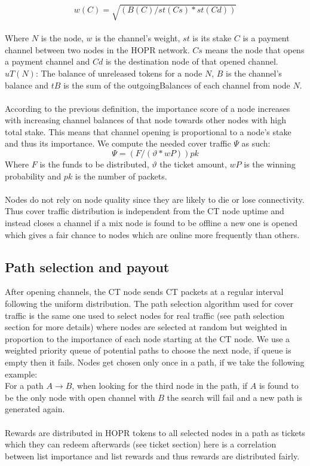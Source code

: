 $$w(C) = \sqrt{(B(C) / st(Cs) * st(Cd))}$$
\\
Where $N$ is the node, $w$ is the channel's weight, $st$ is its stake $C$ is a payment channel between two nodes in the HOPR network. $Cs$ means the node that opens a payment channel and 
$Cd$ is the destination node of that opened channel. $uT(N)$: The balance of unreleased tokens for a node $N$, $B$ is the channel's balance and $tB$ is the sum of the outgoingBalances of each channel from node $N$.
\\~\\ According to the previous definition, the importance score of a node increases with increasing channel balances of that node towards other nodes with high total stake. This means that channel opening is proportional to a node’s stake and thus its importance. We compute the needed cover traffic $\Psi$ as such:
$$\Psi= ( F/ (\vartheta * wP)) pk$$
Where $F$ is the funds to be distributed, $\vartheta$ the ticket amount, $wP$ is the winning probability and $pk$ is the number of packets.
\\~\\Nodes do not rely on node quality since they are likely to die or lose connectivity. Thus cover traffic distribution is independent from the CT node uptime and instead closes a channel if a mix node is found to be offline a new one is opened which gives a fair chance to nodes which are online more frequently than others. 

\subsection{Path selection and payout}
After opening channels, the CT node sends CT packets at a regular interval following the uniform distribution. The path selection algorithm used for cover traffic is the same one used to select nodes for real traffic (see path selection section for more details) where nodes are selected at random  but weighted in proportion to the importance of each node starting at the CT node. We use a weighted priority queue of potential paths to choose the next node, if queue is empty then it fails.
Nodes get chosen only once in a path, if we take the following example:
\\For a path $A\rightarrow B$, when looking for the third node in the path, if $A$ is found to be the only node with open channel with $B$ the search will fail and a new path is generated again.
\\~\\ Rewards are distributed in HOPR tokens to all selected nodes in a path as tickets which they can redeem afterwards (see ticket section) here is a correlation between list importance and list 
rewards and thus rewards are distributed fairly.


